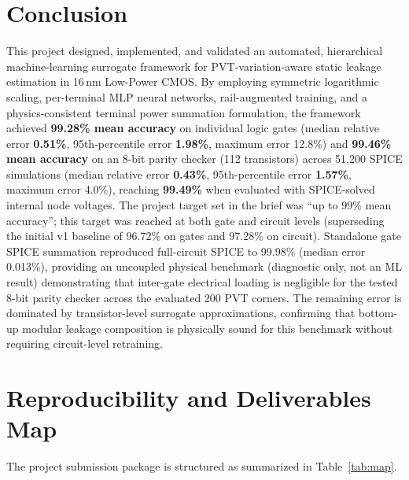 \documentclass[11pt,a4paper]{article}
\numberwithin{table}{section}
\numberwithin{figure}{section}
\begin{document}
\section{Conclusion}
This project designed, implemented, and validated an automated, hierarchical machine-learning surrogate framework for PVT-variation-aware static leakage estimation in 16\,nm Low-Power CMOS. By employing symmetric logarithmic scaling, per-terminal MLP neural networks, rail-augmented training, and a physics-consistent terminal power summation formulation, the framework achieved \textbf{99.28\% mean accuracy} on individual logic gates (median relative error \textbf{0.51\%}, 95th-percentile error \textbf{1.98\%}, maximum error 12.8\%) and \textbf{99.46\% mean accuracy} on an 8-bit parity checker (112 transistors) across 51,200 SPICE simulations (median relative error \textbf{0.43\%}, 95th-percentile error \textbf{1.57\%}, maximum error 4.0\%), reaching \textbf{99.49\%} when evaluated with SPICE-solved internal node voltages. The project target set in the brief was ``up to 99\% mean accuracy''; this target was reached at both gate and circuit levels (superseding the initial v1 baseline of 96.72\% on gates and 97.28\% on circuit). Standalone gate SPICE summation reproduced full-circuit SPICE to 99.98\% (median error 0.013\%), providing an uncoupled physical benchmark (diagnostic only, not an ML result) demonstrating that inter-gate electrical loading is negligible for the tested 8-bit parity checker across the evaluated 200 PVT corners. The remaining error is dominated by transistor-level surrogate approximations, confirming that bottom-up modular leakage composition is physically sound for this benchmark without requiring circuit-level retraining.

\section{Reproducibility and Deliverables Map}
The project submission package is structured as summarized in Table~\ref{tab:map}.
\end{document}

